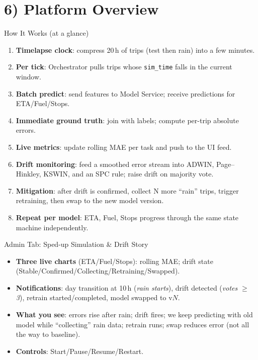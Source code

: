 \documentclass[aspectratio=169]{beamer}
\begin{document}
\section{6) Platform Overview}
\begin{frame}{How It Works (at a glance)}
\begin{enumerate}
  \item \textbf{Timelapse clock}: compress 20\,h of trips (test then rain) into a few minutes.
  \item \textbf{Per tick}: Orchestrator pulls trips whose \texttt{sim\_time} falls in the current window.
  \item \textbf{Batch predict}: send features to Model Service; receive predictions for ETA/Fuel/Stops.
  \item \textbf{Immediate ground truth}: join with labels; compute per-trip absolute errors.
  \item \textbf{Live metrics}: update rolling MAE per task and push to the UI feed.
  \item \textbf{Drift monitoring}: feed a smoothed error stream into ADWIN, Page--Hinkley, KSWIN, and an SPC rule; raise drift on majority vote.
  \item \textbf{Mitigation}: after drift is confirmed, collect N more “rain” trips, trigger retraining, then swap to the new model version.
  \item \textbf{Repeat per model}: ETA, Fuel, Stops progress through the same state machine independently.
\end{enumerate}
\end{frame}

\begin{frame}{Admin Tab: Sped-up Simulation \& Drift Story}
\begin{itemize}
  \item \textbf{Three live charts} (ETA/Fuel/Stops): rolling MAE; drift state (Stable/Confirmed/Collecting/Retraining/Swapped).
  \item \textbf{Notifications}: day transition at 10\,h (\emph{rain starts}), drift detected (\emph{votes \(\ge\)3}), retrain started/completed, model swapped to v\(N\).
  \item \textbf{What you see}: errors rise after rain; drift fires; we keep predicting with old model while “collecting” rain data; retrain runs; swap reduces error (not all the way to baseline).
  \item \textbf{Controls}: Start/Pause/Resume/Restart.
\end{itemize}
\end{frame}
\end{document}
